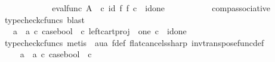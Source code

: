 \begin{isabellebody}
\ \ \ \ \ \ \ \isamarkupfalse%
\ \isamarkupfalse%
\ {\isachardoublequoteopen}{\isachardot}{\kern0pt}{\isachardot}{\kern0pt}{\isachardot}{\kern0pt}\ {\isacharequal}{\kern0pt}\ {\isacharparenleft}{\kern0pt}eval{\isacharunderscore}{\kern0pt}func\ A\ {\isasymOmega}\ {\isasymcirc}\isactrlsub c\ {\isacharparenleft}{\kern0pt}id{\isacharparenleft}{\kern0pt}{\isasymOmega}{\isacharparenright}{\kern0pt}\ {\isasymtimes}\isactrlsub f\ f{\isacharparenright}{\kern0pt}{\isacharparenright}{\kern0pt}\ {\isasymcirc}\isactrlsub c\ {\isasymlangle}{\isasymt}{\isacharcomma}{\kern0pt}\ id{\isacharparenleft}{\kern0pt}one{\isacharparenright}{\kern0pt}{\isasymrangle}{\isachardoublequoteclose}\isanewline
\ \ \ \ \ \ \ \ \ \isamarkupfalse%
\ comp{\isacharunderscore}{\kern0pt}associative{}\ \isamarkupfalse%
\ {\isacharparenleft}{\kern0pt}typecheck{\isacharunderscore}{\kern0pt}cfuncs{\isacharcomma}{\kern0pt}\ blast{\isacharparenright}{\kern0pt}\isanewline
\ \ \ \ \ \ \ \isamarkupfalse%
\ \isamarkupfalse%
\ {\isachardoublequoteopen}{\isachardot}{\kern0pt}{\isachardot}{\kern0pt}{\isachardot}{\kern0pt}\ {\isacharequal}{\kern0pt}\ {\isacharparenleft}{\kern0pt}{\isacharparenleft}{\kern0pt}a{}\ {\isasymamalg}\ a{}{\isacharparenright}{\kern0pt}\ {\isasymcirc}\isactrlsub c\ case{\isacharunderscore}{\kern0pt}bool\ \ {\isasymcirc}\isactrlsub c\ left{\isacharunderscore}{\kern0pt}cart{\isacharunderscore}{\kern0pt}proj\ {\isasymOmega}\ one{\isacharparenright}{\kern0pt}\ {\isasymcirc}\isactrlsub c\ {\isasymlangle}{\isasymt}{\isacharcomma}{\kern0pt}\ id{\isacharparenleft}{\kern0pt}one{\isacharparenright}{\kern0pt}{\isasymrangle}{\isachardoublequoteclose}\isanewline
\ \ \ \ \ \ \ \ \ \isamarkupfalse%
\ {\isacharparenleft}{\kern0pt}typecheck{\isacharunderscore}{\kern0pt}cfuncs{\isacharcomma}{\kern0pt}\ metis\ \ aua\ f{\isacharunderscore}{\kern0pt}def\ flat{\isacharunderscore}{\kern0pt}cancels{\isacharunderscore}{\kern0pt}sharp\ inv{\isacharunderscore}{\kern0pt}transpose{\isacharunderscore}{\kern0pt}func{\isacharunderscore}{\kern0pt}def{}{\isacharparenright}{\kern0pt}\isanewline
\ \ \ \ \ \ \ \isamarkupfalse%
\ \isamarkupfalse%
\ {\isachardoublequoteopen}{\isachardot}{\kern0pt}{\isachardot}{\kern0pt}{\isachardot}{\kern0pt}\ {\isacharequal}{\kern0pt}\ {\isacharparenleft}{\kern0pt}a{}\ {\isasymamalg}\ a{}{\isacharparenright}{\kern0pt}\ {\isasymcirc}\isactrlsub c\ case{\isacharunderscore}{\kern0pt}bool\ \ {\isasymcirc}\isactrlsub c\ {\isasymt}{\isachardoublequoteclose}\isanewline

\end{isabellebody}
